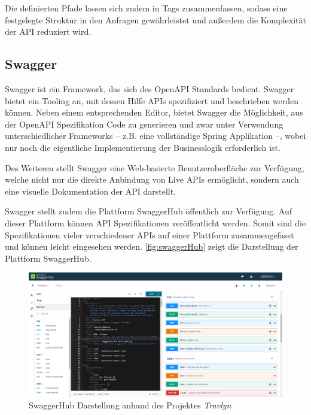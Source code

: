 			Die definierten Pfade lassen sich zudem in Tags zusammenfassen, sodass eine festgelegte Struktur in den Anfragen gewährleistet und außerdem die Komplexität der \acs{API} reduziert wird. 
	
		\subsection{Swagger} %
		
			Swagger ist ein Framework, das sich des OpenAPI Standards bedient. Swagger bietet ein Tooling an, mit dessen Hilfe \acs{API}s spezifiziert und beschrieben werden können. Neben einem entsprechenden Editor, bietet Swagger die Möglichkeit, aus der OpenAPI Spezifikation Code zu generieren und zwar unter Verwendung unterschiedlicher Frameworks -- z.B. eine vollständige Spring Applikation --, wobei nur noch die eigentliche Implementierung der Businesslogik erforderlich ist.
			
			Des Weiteren stellt Swagger eine Web-basierte Benutzeroberfläche zur Verfügung, welche nicht nur die direkte Anbindung von Live \acs{API}s ermöglicht, sondern auch eine visuelle Dokumentation der \acs{API} darstellt. \cite{SmartBear.2020}
			
			Swagger stellt zudem die Plattform SwaggerHub öffentlich zur Verfügung. Auf dieser Plattform können \acs{API} Spezifikationen veröffentlicht werden. Somit sind die Spezifikationen vieler verschiedener \acs{API}s auf einer Plattform zusammengefasst und können leicht eingesehen werden. \autoref{fig:swaggerHub} zeigt die Darstellung der Plattform SwaggerHub.
			
			\begin{figure}[ht!]
				\centering
				\includegraphics[width=1\textwidth]{images/swagger-hub.png}
				\caption{SwaggerHub Darstellung anhand des Projektes \textit{Travlyn}}
				\label{fig:swaggerHub}
			\end{figure} 
			
